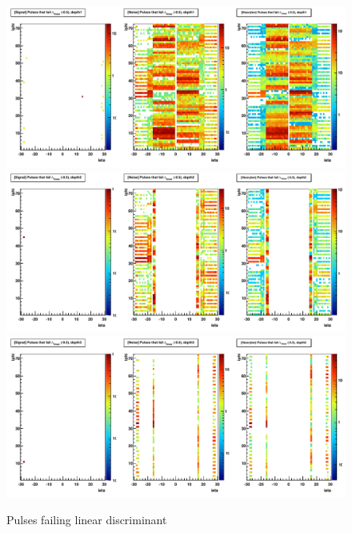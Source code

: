 \begin{figure}
\includegraphics[width=120mm]{DailyLog/6352/6352_Comparison20_Comparison_HFailLambdaLinearIEtaIPhiDepth1}
\includegraphics[width=120mm]{DailyLog/6352/6352_Comparison20_Comparison_HFailLambdaLinearIEtaIPhiDepth2}
\includegraphics[width=120mm]{DailyLog/6352/6352_Comparison20_Comparison_HFailLambdaLinearIEtaIPhiDepth3}
\caption{Pulses failing linear discriminant}
\label{Figure_6352_FailLinear_Geometry}
\end{figure}

